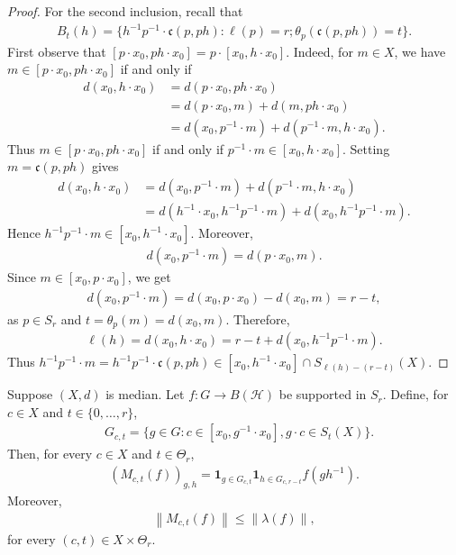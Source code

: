 \documentclass[12pt,reqno]{amsart}
\newcommand{\norm}[1]{\left\|#1\right\|}
\newcommand{\Hil}{\mathcal{H}}
\numberwithin{equation}{section}
\begin{document}
\begin{proof}
    For the second inclusion, recall that
    \begin{align*}
        B_t(h)=\{h^{-1}p^{-1}\cdot \mathfrak{c}(p,ph):\ell(p)=r;\theta_p(\mathfrak{c}(p,ph))=t\}.
    \end{align*}
    First observe that $[p\cdot x_0,ph\cdot x_0]=p\cdot[x_0,h\cdot x_0]$. Indeed, for $m\in X$, we have $m\in[p\cdot x_0,ph\cdot x_0]$ if and only if
        \begin{align*}
            d(x_0,h\cdot x_0)&=d(p\cdot x_0,ph\cdot x_0)\\
            &=d(p\cdot x_0,m)+d(m,ph\cdot x_0)\\
            &=d(x_0,p^{-1}\cdot m)+d(p^{-1}\cdot m,h\cdot x_0).
        \end{align*}
    Thus $m\in[p\cdot x_0,ph\cdot x_0]$ if and only if $p^{-1}\cdot m\in[x_0,h\cdot x_0]$. Setting $m=\mathfrak{c}(p,ph)$ gives 
    \begin{align*}
        d(x_0,h\cdot x_0)&=d(x_0, p^{-1}\cdot m)+d(p^{-1}\cdot m, h\cdot x_0)\\
        &=d(h^{-1}\cdot x_0, h^{-1}p^{-1}\cdot m)+d(x_0,h^{-1}p^{-1}\cdot m).
    \end{align*}
    Hence $h^{-1}p^{-1}\cdot m\in [x_0,h^{-1}\cdot x_0]$. Moreover,
    \begin{align*}
        d(x_0,p^{-1}\cdot m)=d(p\cdot x_0,m).
    \end{align*}
    Since $m\in [x_0,p\cdot x_0]$, we get
    \begin{align*}
        d(x_0,p^{-1}\cdot m)=d(x_0,p\cdot x_0)-d(x_0,m)=r-t,
    \end{align*}
    as $p\in S_r$ and $t=\theta_p(m)=d(x_0,m)$. Therefore,
    \begin{align*}
        \ell(h)=d(x_0,h\cdot x_0)=r-t+d(x_0,h^{-1}p^{-1}\cdot m).
    \end{align*}
    Thus $h^{-1}p^{-1}\cdot m=h^{-1}p^{-1}\cdot \mathfrak{c}(p,ph)\in [x_0,h^{-1}\cdot x_0]\cap S_{\ell(h)-(r-t)}(X)$.
\end{proof}
\begin{lemma}\label{lemma: lower bound median}
    Suppose $(X,d)$ is median.
    Let $f:G\to B(\Hil)$ be supported in $S_r$. Define, for $c\in X$ and $t\in \{0,\ldots, r\}$,
    \begin{align*}
        &G_{c,t}=\{g\in G: c\in [x_0,g^{-1}\cdot x_0], g\cdot c\in S_t(X)\}.
    \end{align*}
    Then, for every $c\in X$ and $t\in \Theta_r$,
    \begin{align*}
        (M_{c,t}(f))_{g,h}= \mathbf{1}_{g\in G_{c,t}}\mathbf{1}_{h\in G_{c,r-t}}f(gh^{-1}).
    \end{align*}
    Moreover,
    \begin{align*}
        \norm{M_{c,t}(f)}\le \norm{\lambda(f)},
    \end{align*}
    for every $(c,t)\in X\times \Theta_r$.
\end{lemma}
\end{document}
